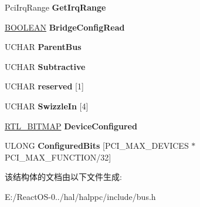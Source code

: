 \begin{DoxyCompactItemize}
\begin{tabbing}
\end{tabbing}\item 
\mbox{\label{struct___p_c_i_p_b_u_s_d_a_t_a_a4a4337cf96d4ef21900d4f403bcd9a4b}} 
Pci\+Irq\+Range {\bfseries Get\+Irq\+Range}
\item 
\mbox{\label{struct___p_c_i_p_b_u_s_d_a_t_a_ac0d2e219c00d235c6139e684c21b17d6}} 
\hyperlink{_processor_bind_8h_a112e3146cb38b6ee95e64d85842e380a}{B\+O\+O\+L\+E\+AN} {\bfseries Bridge\+Config\+Read}
\item 
\mbox{\label{struct___p_c_i_p_b_u_s_d_a_t_a_ad28d91d4cfce203bb737434ed564c3a1}} 
U\+C\+H\+AR {\bfseries Parent\+Bus}
\item 
\mbox{\label{struct___p_c_i_p_b_u_s_d_a_t_a_ab14940d7cfd27167af842327a3a6c327}} 
U\+C\+H\+AR {\bfseries Subtractive}
\item 
\mbox{\label{struct___p_c_i_p_b_u_s_d_a_t_a_a8b0b83c5ac5b62d269fdeb76c443640a}} 
U\+C\+H\+AR {\bfseries reserved} \mbox{[}1\mbox{]}
\item 
\mbox{\label{struct___p_c_i_p_b_u_s_d_a_t_a_a5b7fb80933854136700ea37180592a57}} 
U\+C\+H\+AR {\bfseries Swizzle\+In} \mbox{[}4\mbox{]}
\item 
\mbox{\label{struct___p_c_i_p_b_u_s_d_a_t_a_aaf99152e6edfd84461c13343bbeaf01d}} 
\hyperlink{struct___r_t_l___b_i_t_m_a_p}{R\+T\+L\+\_\+\+B\+I\+T\+M\+AP} {\bfseries Device\+Configured}
\item 
\mbox{\label{struct___p_c_i_p_b_u_s_d_a_t_a_a28365ddfa6aad41d74398a4d24d0af61}} 
U\+L\+O\+NG {\bfseries Configured\+Bits} \mbox{[}P\+C\+I\+\_\+\+M\+A\+X\+\_\+\+D\+E\+V\+I\+C\+ES $\ast$P\+C\+I\+\_\+\+M\+A\+X\+\_\+\+F\+U\+N\+C\+T\+I\+ON/32\mbox{]}
\end{DoxyCompactItemize}


该结构体的文档由以下文件生成\+:\begin{DoxyCompactItemize}
\item 
E\+:/\+React\+O\+S-\/0../hal/halppc/include/bus.\+h\end{DoxyCompactItemize}

